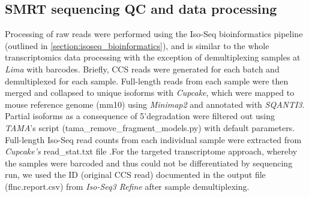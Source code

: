 \subsection{SMRT sequencing QC and data processing}
Processing of raw reads were performed using the Iso-Seq bioinformatics pipeline (outlined in \cref{section:isoseq_bioinformatics}), and is similar to the whole transcriptomics data processing with the exception of demultiplexing samples at \textit{Lima} with barcodes. Briefly, CCS reads were generated for each batch and demultiplexed for each sample. Full-length reads from each sample were then merged and collapsed to unique isoforms with \textit{Cupcake}, which were mapped to mouse reference genome (mm10) using \textit{Minimap2} and annotated with \textit{SQANTI3}. Partial isoforms as a consequence of 5'degradation were filtered out using \textit{TAMA}'s script (tama\_remove\_fragment\_models.py) with default parameters. Full-length Iso-Seq read counts from each individual sample were extracted from \textit{Cupcake's} read\_stat.txt file .For the targeted transcriptome approach, whereby the samples were barcoded and thus could not be differentiated by sequencing run, we used the ID (original CCS read) documented in the output file (flnc.report.csv) from \textit{Iso-Seq3 Refine} after sample demultiplexing. 

